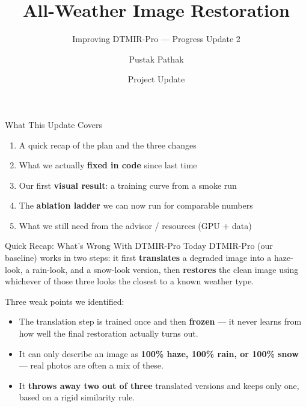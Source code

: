 \documentclass[11pt]{beamer}
\title[Improving DTMIR-Pro]{All-Weather Image Restoration}
\subtitle{Improving DTMIR-Pro --- Progress Update 2}
\author{Pustak Pathak}
\institute{Advisor: Dr. Snehasis Mukherjee}
\date{Project Update}
\begin{document}
\begin{frame}
\titlepage
\end{frame}

\begin{frame}{What This Update Covers}
\begin{enumerate}
  \item A quick recap of the plan and the three changes
  \item What we actually \textbf{fixed in code} since last time
  \item Our first \textbf{visual result}: a training curve from a smoke run
  \item The \textbf{ablation ladder} we can now run for comparable numbers
  \item What we still need from the advisor / resources (GPU + data)
\end{enumerate}
\end{frame}

\begin{frame}{Quick Recap: What's Wrong With DTMIR-Pro Today}
DTMIR-Pro (our baseline) works in two steps: it first \textbf{translates} a degraded
image into a haze-look, a rain-look, and a snow-look version, then \textbf{restores}
the clean image using whichever of those three looks the closest to a known weather type.

\vspace{4mm}
Three weak points we identified:
\begin{itemize}
  \item[1] The translation step is trained once and then \textbf{frozen} --- it never
  learns from how well the final restoration actually turns out.
  \item[2] It can only describe an image as \textbf{100\% haze, 100\% rain, or
  100\% snow} --- real photos are often a mix of these.
  \item[3] It \textbf{throws away two out of three} translated versions and keeps
  only one, based on a rigid similarity rule.
\end{itemize}
\end{frame}
\end{document}
